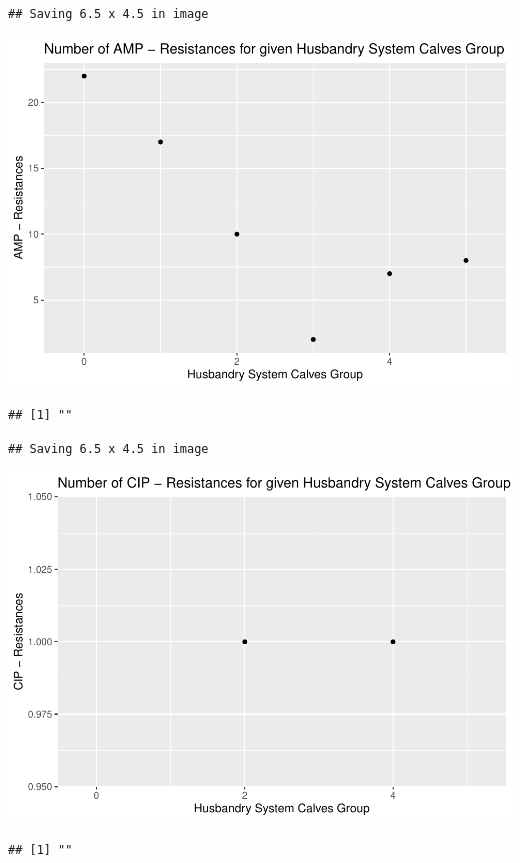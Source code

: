\documentclass[
]{article}
\begin{document}
\begin{verbatim}
## Saving 6.5 x 4.5 in image
\end{verbatim}

\includegraphics{NResistenzen_files/figure-latex/binary_or_nominal_variables-31.pdf}

\begin{verbatim}
## [1] ""
\end{verbatim}

\begin{verbatim}
## Saving 6.5 x 4.5 in image
\end{verbatim}

\includegraphics{NResistenzen_files/figure-latex/binary_or_nominal_variables-32.pdf}

\begin{verbatim}
## [1] ""
\end{verbatim}
\end{document}
